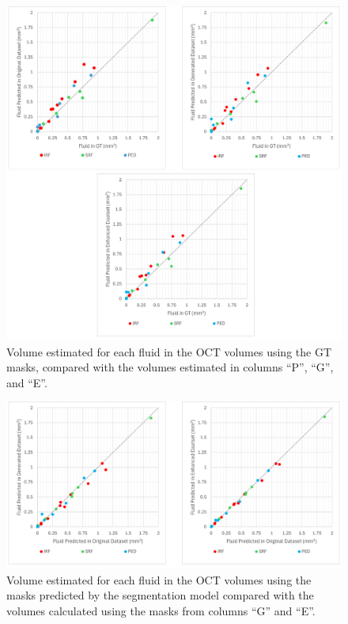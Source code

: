 \begin{figure}[!ht]
	\centering	
	\includegraphics[width=1.0\linewidth]{figures/Experiment6GTvsAll.png}
	\caption{Volume estimated for each fluid in the OCT volumes using the GT masks, compared with the volumes estimated in columns ``P'', ``G'', and ``E''.}
	\label{fig:Experiment6GTvsAll}
\end{figure}

\begin{figure}[!ht]
	\centering	\includegraphics[width=1.0\linewidth]{figures/Experiment6PredictedVsAll.png}
	\caption{Volume estimated for each fluid in the OCT volumes using the masks predicted by the segmentation model compared with the volumes calculated using the masks from columns ``G'' and ``E''.}
	\label{fig:Experiment6PredictedVsAll}
\end{figure}


